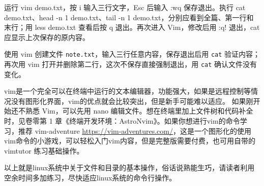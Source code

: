 \begin{example}[编辑、分页查看与退出]
运行 vim demo.txt，按 i 输入三行文字，Esc 后输入 :wq 保存退出。执行 cat demo.txt、head -n 1 demo.txt、tail -n 1 demo.txt，分别应看到全篇、第一行和末行；用 less demo.txt 查看后按 q 退出。再次进入 Vim，修改后用 :q! 退出，cat 应显示上次保存的原内容。
\end{example}
\begin{exercise}\label{ex:v1-vim-edit}
使用 vim 创建文件 \texttt{note.txt}，输入三行任意内容，保存退出后用 \texttt{cat} 验证内容；再次用 vim 打开并删除第二行，这次不保存直接强制退出，用 \texttt{cat} 确认文件没有变化。
\end{exercise}

\begin{note}
vim是一个完全可以在终端中运行的文本编辑器，功能强大，如果是远程控制等情况没有图形化界面，vim的优点就会比较突出，但是新手可能难以适应。
如果刚开始还不熟悉 Vim，可以先用 nano 编辑文件。想在终端里加上文件树和代码补全时，见卷零第 1 章《终端开发环境：AstroNvim》。如果你想进行vim的命令学习，推荐 vim-adventure \url{https://vim-adventures.com/}，这是一个图形化的使用vim命令的小游戏，可以轻松入门vim内容，但是完整版需要付费，也可用自带的 vimtutor 练习基础操作。
\end{note}

以上就是linux系统中关于文件和目录的基本操作，俗话说熟能生巧，请读者利用空余时间多加练习，尽快适应linux系统的命令行操作。
